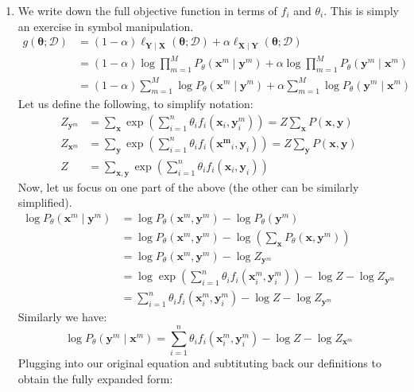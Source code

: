 \documentclass[12pt]{article}
\newcommand{\vect}[1]{\boldsymbol{#1}}
\begin{document}
\begin{enumerate}[label=(\alph*)]
  \item We write down the full objective function in terms of $f_i$ and $\theta_i$. This is simply an exercise in symbol manipulation.
  \begin{align*}
  	g(\vect{\theta}; \mathcal{D}) &= (1-\alpha)\ell_{\vect{Y}\mid \vect{X}}(\vect{\theta}; \mathcal{D}) + \alpha\ell_{\vect{X}\mid\vect{Y}}(\vect{\theta}; \mathcal{D}) \\
  	&= (1- \alpha)\log \prod_{m=1}^M P_{\theta}(\vect{x}^m \mid \vect{y}^m) + \alpha \log \prod_{m=1}^M P_{\theta}(\vect{y}^m \mid \vect{x}^m) \\
  	&= (1- \alpha)\sum_{m=1}^M \log P_{\theta}(\vect{x}^m \mid \vect{y}^m) + \alpha \sum_{m=1}^M \log P_{\theta}(\vect{y}^m \mid \vect{x}^m)
  \end{align*}
  Let us define the following, to simplify notation:
  \begin{align*}
  	Z_{\vect{y}^m} &= \sum_{\vect{x}} \exp\left(\sum_{i =1}^n \theta_i f_i(\vect{x}_i, \vect{y}^m_i)\right) = Z\sum_{\vect{x}} P(\vect{x}, \vect{y}) \\
  	Z_{\vect{x}^m} &= \sum_{\vect{y}} \exp\left(\sum_{i =1}^n \theta_i f_i(\vect{x^m}_i, \vect{y}_i)\right) = Z\sum_{\vect{y}} P(\vect{x}, \vect{y}) \\
  	Z &= \sum_{\vect{x}, \vect{y}} \exp\left(\sum_{i=1}^n \theta_i f_i(\vect{x}_i, \vect{y}_i)\right)
  \end{align*}
  Now, let us focus on one part of the above (the other can be similarly simplified). 
  \begin{align*}
  	\log P_{\theta}(\vect{x}^m \mid \vect{y}^m) &= \log P_{\theta}(\vect{x}^m, \vect{y}^m) - \log P_{\theta}(\vect{y}^m) \tag{Bayes Rule} \\
  	&= \log P_{\theta}(\vect{x}^m, \vect{y}^m) - \log \left(\sum_{\vect{x}} P_{\theta}(\vect{x}, \vect{y}^m)\right)\\
  	&= \log P_{\theta}(\vect{x}^m, \vect{y}^m) - \log Z_{\vect{y}^m} \\
  	&= \log \exp(\sum_{i=1}^n \theta_i f_i(\vect{x}^m_i, \vect{y}^m_i)) - \log Z - \log Z_{\vect{y}^m} \\
  	&= \sum_{i=1}^n \theta_i f_i (\vect{x}_i^m, \vect{y}_i^m) - \log Z - \log Z_{\vect{y}^m}
  \end{align*}
  Similarly we have:
  $$
		\log P_{\theta}(\vect{y}^m \mid \vect{x}^m) = \sum_{i=1}^n \theta_i f_i (\vect{x}_i^m, \vect{y}_i^m) - \log Z - \log Z_{\vect{x}^m}
  $$
  Plugging into our original equation and subtituting back our definitions to obtain the fully expanded form:

\end{enumerate}
\end{document}
